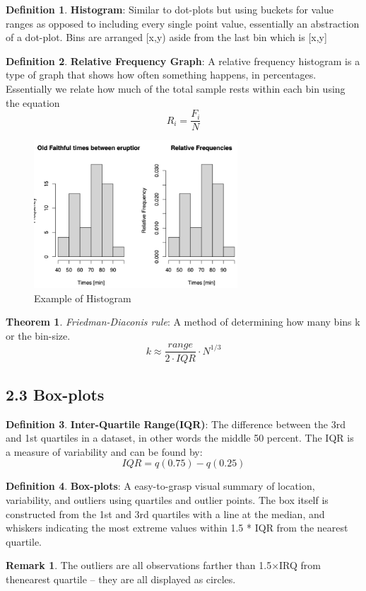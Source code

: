 \documentclass[12pt]{amsart}
\theoremstyle{definition}
\newtheorem{theorem}{Theorem}  %
\newtheorem{definition}{Definition} %
\newtheorem*{remark}{Remark}        %
\numberwithin{equation}{theorem}    %
\begin{document}
\begin{definition}
    \textbf{Histogram}:
    Similar to dot-plots but using buckets for value ranges as opposed to including every single point value, essentially an abstraction of a dot-plot.
    Bins are arranged [x,y) aside from the last bin which is [x,y]
\end{definition}

\begin{definition}
    \textbf{Relative Frequency Graph}:
    A relative frequency histogram is a type of graph that shows how often something happens, in percentages. Essentially we relate how much of the total sample rests within each bin using the equation $$R_i = \frac{F_i}{N}$$
\end{definition}


\begin{figure}[H]
    \centering
    \includegraphics[width=3in]{Media/histogram.png}
    \caption{Example of  Histogram}
    \label{Histogram}
\end{figure}

\begin{theorem}
    \textit{Friedman-Diaconis rule}:
    A method of determining how many bins k or the bin-size. $$k \approx \frac{range}{2 \cdot IQR} \cdot N^{1/3}$$
\end{theorem}

\subsection*{2.3 Box-plots}
\begin{definition}
    \textbf{Inter-Quartile Range(IQR)}:
    The difference between the 3rd and 1st quartiles in a dataset, in other words the middle 50 percent. The IQR is a measure of variability and can be found by:
    $$IQR = q(0.75)- q(0.25)$$
\end{definition}

\begin{definition}
    \textbf{Box-plots}:
    A easy-to-grasp visual summary of location, variability, and outliers using quartiles and outlier points. The box itself is constructed from the 1st and 3rd quartiles with a line at the median, and whiskers indicating the most extreme values within 1.5 * IQR from the nearest quartile.
    \begin{remark}
        The outliers are all observations farther than 1.5×IRQ from thenearest quartile – they are all displayed as circles.
    \end{remark}
\end{definition}
\end{document}
